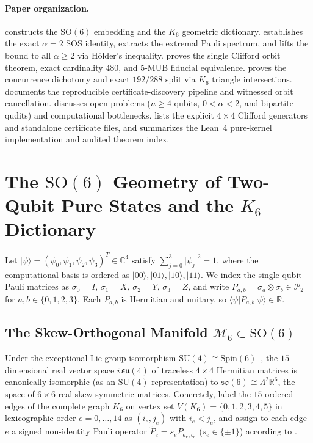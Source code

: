 \documentclass[11pt,a4paper]{article}
\theoremstyle{plain}
\theoremstyle{definition}
\theoremstyle{remark}
\newcommand{\C}{\mathbb{C}}
\newcommand{\R}{\mathbb{R}}
\newcommand{\ket}[1]{\lvert #1 \rangle}
\newcommand{\expval}[2]{\langle #1 \vert #2 \vert #1 \rangle}
\newcommand{\SO}{\mathrm{SO}}
\newcommand{\SU}{\mathrm{SU}}
\newcommand{\Spin}{\mathrm{Spin}}
\newcommand{\Pauli}{\mathcal{P}}
\newcommand{\Mman}{\mathcal{M}_6}
\begin{document}
\paragraph{Paper organization.}
 constructs the $\SO(6)$ embedding and the $K_6$ geometric dictionary.  establishes the exact $\alpha = 2$ SOS identity, extracts the extremal Pauli spectrum, and lifts the bound to all $\alpha \ge 2$ via H\"older's inequality.  proves the single Clifford orbit theorem, exact cardinality $480$, and $5$-MUB fiducial equivalence.  proves the concurrence dichotomy and exact $192/288$ split via $K_6$ triangle intersections.  documents the reproducible certificate-discovery pipeline and witnessed orbit cancellation.  discusses open problems ($n \ge 4$ qubits, $0 < \alpha < 2$, and bipartite qudits) and computational bottlenecks.  lists the explicit $4\times 4$ Clifford generators and standalone certificate files, and  summarizes the Lean~4 pure-kernel implementation and audited theorem index.

\FloatBarrier
\section{The \texorpdfstring{$\SO(6)$}{SO(6)} Geometry of Two-Qubit Pure States and the \texorpdfstring{$K_6$}{K6} Dictionary}
\label{sec:so6}

Let $\ket{\psi} = (\psi_0, \psi_1, \psi_2, \psi_3)^T \in \C^4$ satisfy $\sum_{j=0}^3 \lvert\psi_j\rvert^2 = 1$, where the computational basis is ordered as $\ket{00}, \ket{01}, \ket{10}, \ket{11}$. We index the single-qubit Pauli matrices as $\sigma_0 = I$, $\sigma_1 = X$, $\sigma_2 = Y$, $\sigma_3 = Z$, and write $P_{a,b} = \sigma_a \otimes \sigma_b \in \Pauli_2$ for $a, b \in \{0,1,2,3\}$. Each $P_{a,b}$ is Hermitian and unitary, so $\expval{\psi}{P_{a,b}} \in \R$.

\subsection{The Skew-Orthogonal Manifold \texorpdfstring{$\Mman \subset \SO(6)$}{M6 subset SO(6)}}

Under the exceptional Lie group isomorphism $\SU(4) \cong \Spin(6)$~\cite{FultonHarris1991}, the $15$-dimensional real vector space $i\,\mathfrak{su}(4)$ of traceless $4\times 4$ Hermitian matrices is canonically isomorphic (as an $\SU(4)$-representation) to $\mathfrak{so}(6) \cong \Lambda^2 \R^6$, the space of $6\times 6$ real skew-symmetric matrices. Concretely, label the $15$ ordered edges of the complete graph $K_6$ on vertex set $V(K_6) = \{0,1,2,3,4,5\}$ in lexicographic order $e = 0, \dots, 14$ as $(i_e, j_e)$ with $i_e < j_e$, and assign to each edge $e$ a signed non-identity Pauli operator $\tilde{P}_e = s_e P_{a_e, b_e}$ ($s_e \in \{\pm 1\}$) according to .
\end{document}
